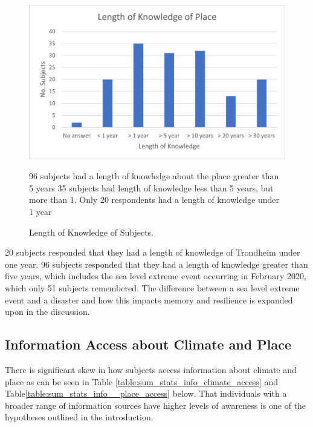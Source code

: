 \begin{figure}[H]
    \centering
    \includegraphics{fig_results/long_know.png}
    \caption{Length of Knowledge of Subjects.}{ 96 subjects had a length of knowledge about the place greater than 5 years 35 subjects had length of knowledge less than 5 years, but more than 1. Only 20 respondents had a length of knowledge under 1 year}
    \label{fig:long_know}
\end{figure}

20 subjects responded that they had a length of knowledge of Trondheim under one year. 96 subjects responded that they had a length of knowledge greater than five years, which includes the sea level extreme event occurring in February 2020, which only 51 subjects remembered. The difference between a sea level extreme event and a disaster and how this impacts memory and resilience is expanded upon in the discussion.


\subsection{Information Access about Climate and Place}

There is significant skew in how subjects access information about climate and place as can be seen in Table \ref{table:sum_stats_info_climate_access} and Table\ref{table:sum_stats_info__place_access} below. That individuals with a broader range of information sources have higher levels of awareness is one of the hypotheses outlined in the introduction. 

